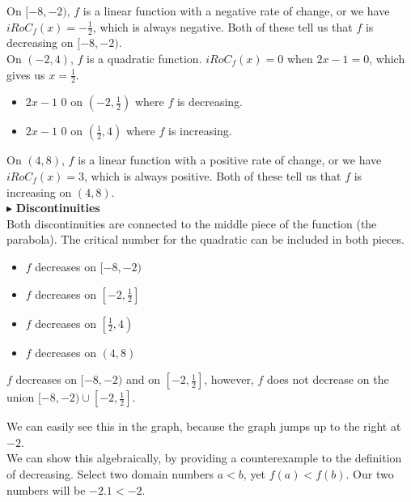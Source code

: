 \documentclass{ximera}
\begin{document}
\begin{exercise}
\begin{question}
On $[-8, -2)$, $f$ is a linear function with a negative rate of change, or we have $iRoC_f(x) = -\frac{1}{2}$, which is always negative.  Both of these tell us that $f$ is decreasing on $[-8, -2)$. \\


On $(-2, 4)$, $f$ is a quadratic function.  $iRoC_f(x) = 0$ when $2x - 1 = 0$, which gives us $x = \frac{1}{2}$.


\begin{itemize}
\item $2x - 1$ \wordChoice{\choice[correct]{<} \choice{>}}  $0$ on  $\left( -2, \frac{1}{2}  \right)$ where $f$ is decreasing.
\item $2x - 1$ \wordChoice{\choice{<} \choice[correct]{>}}  $0$ on  $\left( \frac{1}{2}, 4 \right)$ where $f$ is increasing.
\end{itemize}

On $(4, 8)$, $f$ is a linear function with a positive rate of change, or we have $iRoC_f(x) = 3$, which is always positive.  Both of these tell us that $f$ is increasing on $(4, 8)$. \\




$\blacktriangleright$ \textbf{Discontinuities} \\


Both discontinuities are connected to the middle piece of the function (the parabola). The critical number for the quadratic can be included in both pieces.



\begin{itemize}
\item $f$ decreases on $[-8, -2)$
\item $f$ decreases on $\left[ -2, \frac{1}{2}  \right]$
\item $f$ decreases on $\left[ \frac{1}{2}, 4 \right)$
\item $f$ decreases on $(4, 8)$
\end{itemize}

\begin{warning}


$f$ decreases on $[-8, -2)$ and on $\left[ -2, \frac{1}{2}  \right]$, however, $f$ does not decrease on the union $[-8, -2) \cup \left[ -2, \frac{1}{2}  \right]$.

We can easily see this in the graph, because the graph jumps up to the right at $-2$. \\

We can show this algebraically, by providing a counterexample to the definition of decreasing. Select two domain numbers $a < b$, yet $f(a) < f(b)$.  Our two numbers will be $-2.1 < -2$.



\end{warning}
\end{question}
\end{exercise}
\end{document}
